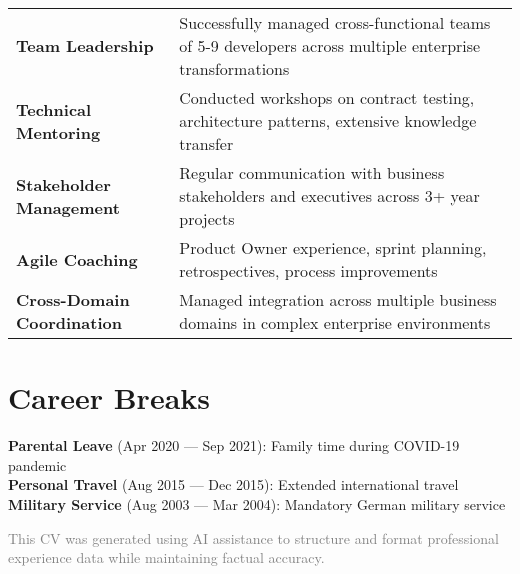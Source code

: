 \documentclass[10pt,a4paper]{article}
\begin{document}
\begin{tabularx}{\textwidth}{@{}p{4cm}X@{}}
\textbf{Team Leadership} & Successfully managed cross-functional teams of 5-9 developers across multiple enterprise transformations \\
\textbf{Technical Mentoring} & Conducted workshops on contract testing, architecture patterns, extensive knowledge transfer \\
\textbf{Stakeholder Management} & Regular communication with business stakeholders and executives across 3+ year projects \\
\textbf{Agile Coaching} & Product Owner experience, sprint planning, retrospectives, process improvements \\
\textbf{Cross-Domain Coordination} & Managed integration across multiple business domains in complex enterprise environments \\
\end{tabularx}

\section{Career Breaks}

\textbf{Parental Leave} (Apr 2020 — Sep 2021): Family time during COVID-19 pandemic \\
\textbf{Personal Travel} (Aug 2015 — Dec 2015): Extended international travel \\
\textbf{Military Service} (Aug 2003 — Mar 2004): Mandatory German military service

\vfill

\textcolor{gray}{\small This CV was generated using AI assistance to structure and format professional experience data while maintaining factual accuracy.}
\end{document}
